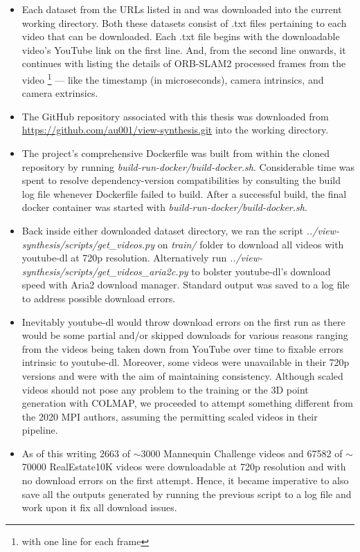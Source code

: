 \begin{itemize}
    \item Each dataset from the URLs listed in \cite{zhou2018stereo} and \cite{li2019learning} was downloaded into the current working directory. Both these datasets consist of .txt files pertaining to each video that can be downloaded. Each .txt file begins with the downloadable video’s YouTube link on the first line. And, from the second line onwards, it continues with listing the details of ORB-SLAM2 processed frames from the video \footnote{with one line for each frame} --- like the timestamp (in microseconds), camera intrinsics, and camera extrinsics.
    \item The GitHub repository associated with this thesis was downloaded from \url{https://github.com/au001/view-synthesis.git} into the working directory.
    \item The project's comprehensive Dockerfile was built from within the cloned repository by running \textit{build-run-docker/build-docker.sh}. Considerable time was spent to resolve dependency-version compatibilities by consulting the build log file whenever Dockerfile failed to build. After a successful build, the final docker container was started with \textit{build-run-docker/build-docker.sh}.
    \item {\sloppy Back inside either downloaded dataset directory, we ran the script \textit{../view-synthesis/scripts/get\_videos.py} on \textit{train/} folder to download all videos with youtube-dl at 720p resolution. Alternatively run \textit{../view-synthesis/scripts/get\_videos\_aria2c.py} to bolster youtube-dl’s download speed with Aria2 download manager. Standard output was saved to a log file to address possible download errors.}  
    \item Inevitably youtube-dl would throw download errors on the first run as there would be some partial and/or skipped downloads for various reasons ranging from the videos being taken down from YouTube over time to fixable errors intrinsic to youtube-dl. Moreover, some videos were unavailable in their 720p versions and were with the aim of maintaining consistency. Although scaled videos should not pose any problem to the training or the 3D point generation with COLMAP, we proceeded to attempt something different from the 2020 MPI authors, assuming the permitting scaled videos in their pipeline.
    \item As of this writing 2663 of $\sim$3000 Mannequin Challenge videos and 67582 of $\sim$70000 RealEstate10K videos were downloadable at 720p resolution and with no download errors on the first attempt. Hence, it became imperative to also save all the outputs generated by running the previous script to a log file and work upon it fix all download issues.
\end{itemize}

